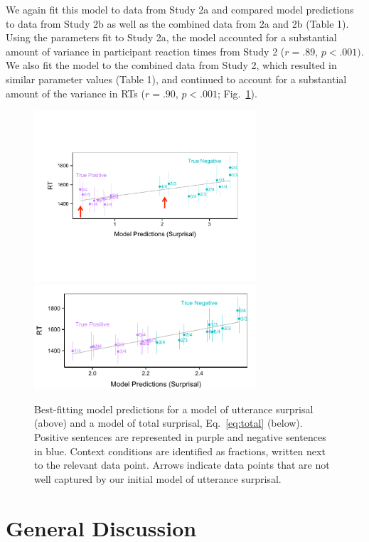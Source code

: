 \documentclass[10pt,letterpaper]{article}
\begin{document}
We again fit this model to data from Study 2a and compared model predictions to data from Study 2b as well as the combined data from 2a and 2b (Table 1).  Using the parameters fit to Study 2a, the model accounted for a substantial amount of variance in participant reaction times from Study 2 ($r=.89$, $p<.001)$.  We also fit the model to the combined data from Study 2, which resulted in similar parameter values (Table 1), and continued to account for a substantial amount of the variance in RTs ($r=.90$, $p<.001$; Fig.\ \ref{fig:model1_sims}).   

\begin{figure}[t]
\begin{center} 
\includegraphics[width=3.25in]{figures/model1_comparison.pdf}
\includegraphics[width=3.25in]{figures/model2_comparison.pdf}
\caption{\label{fig:model1_sims} Best-fitting model predictions for a model of utterance surprisal (above) and a model of total surprisal, Eq.\ \ref{eq:total} (below).  Positive sentences are represented in purple and negative sentences in blue.  Context conditions are identified as fractions, written next to the relevant data point.  Arrows indicate data points that are not well captured by our initial model of utterance surprisal.}
\end{center} 
\end{figure}





\section{General Discussion}
\end{document}
